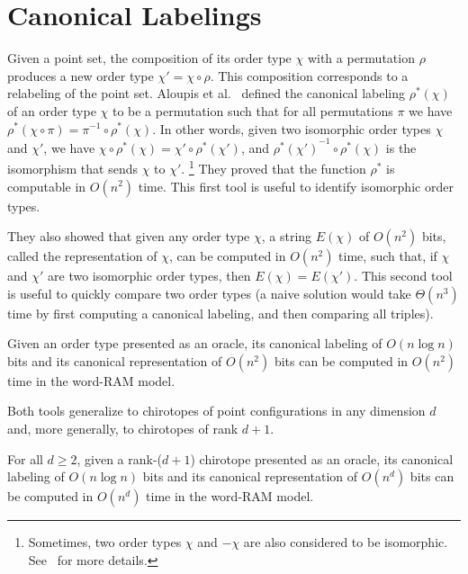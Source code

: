 \section{Canonical Labelings}%
\label{sec:point-configurations:canonical-labelings}

Given a point set, the composition of its order type \(\chi\) with a
permutation \(\rho\) produces a new order type \(\chi' = \chi \circ \rho\).
This composition corresponds to a relabeling of the point set.
%
Aloupis et al.~\cite{AILOW14} defined the canonical labeling \(\rho^*(\chi)\)
of an order type \(\chi\) to be a permutation such that for all permutations
\(\pi\) we have \(\rho^*(\chi \circ \pi) = \pi^{-1} \circ \rho^*(\chi)\).
In other words, given two isomorphic order types \(\chi\) and \(\chi'\), we
have \(\chi \circ \rho^*(\chi) = \chi' \circ \rho^*(\chi')\), and
\({\rho^*(\chi')}^{-1} \circ \rho^*(\chi)\) is the isomorphism that sends
\(\chi\) to \(\chi'\).%
\footnote{Sometimes, two order types \(\chi\) and \(- \chi\) are also considered
to be isomorphic. See~\cite{AILOW14} for more details.}
They proved that the function \(\rho^*\) is
computable in \(O(n^2)\) time.
%
This first tool is useful to identify isomorphic order types.

They also showed that given any order type \(\chi\), a string \(E(\chi)\) of
\(O(n^2)\) bits, called the representation of \(\chi\), can be computed in
\(O(n^2)\) time, such that, if \(\chi\) and \(\chi'\) are two isomorphic order
types, then \(E(\chi) = E(\chi')\).
%
This second tool is useful to quickly compare two order types (a naive solution
would take \(\Theta(n^3)\) time by first computing a canonical labeling, and
then comparing all triples).

\begin{lemma}\label{lem:canonical-labeling}
  Given an order type presented as an oracle,
  its canonical labeling of \(O(n \log n)\) bits
  and
  its canonical representation of \(O(n^2)\) bits
  can be computed in \(O(n^2)\) time
  in the word-RAM model.
\end{lemma}

Both tools generalize to chirotopes of point configurations in any dimension
\(d\) and, more generally, to chirotopes of rank \(d+1\).

\begin{lemma}\label{lem:canonical-labeling-d}
  For all \(d \geq 2\),
  given a rank-(\(d+1\)) chirotope presented as an oracle,
  its canonical labeling of \(O(n \log n)\) bits
  and
  its canonical representation of \(O(n^d)\) bits
  can be computed in \(O(n^d)\) time
  in the word-RAM model.
\end{lemma}
